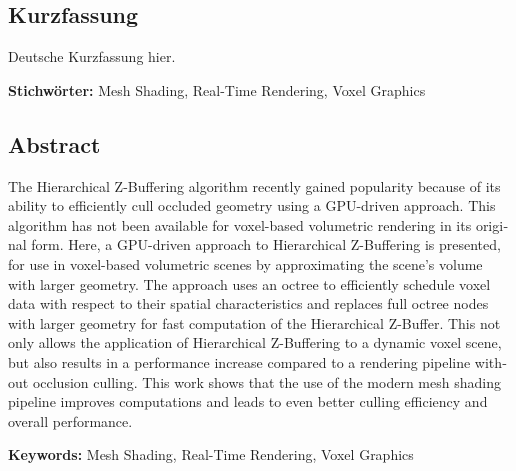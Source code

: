 \cleardoublepage

\begin{otherlanguage}{ngerman}
\chapter*{Kurzfassung}

Deutsche Kurzfassung hier.

\vfill
\noindent\textbf{Stichwörter:} Mesh Shading, Real-Time Rendering, Voxel Graphics
\vfill
\end{otherlanguage}
\begin{otherlanguage}{english}
\chapter*{Abstract}

The Hierarchical Z-Buffering algorithm recently gained popularity because of its ability to 
efficiently cull occluded geometry using a GPU-driven approach. This algorithm has not been 
available for voxel-based volumetric rendering in its original form. Here, a GPU-driven 
approach to Hierarchical Z-Buffering is presented, for use in voxel-based volumetric scenes 
by approximating the scene's volume with larger geometry. The approach uses an octree to 
efficiently schedule voxel data with respect to their spatial characteristics and replaces 
full octree nodes with larger geometry for fast computation of the Hierarchical Z-Buffer. 
This not only allows the application of Hierarchical Z-Buffering to a dynamic voxel scene, 
but also results in a performance increase compared to a rendering pipeline without occlusion 
culling. This work shows that the use of the modern mesh shading pipeline improves computations 
and leads to even better culling efficiency and overall performance.

\vfill
\noindent\textbf{Keywords:} Mesh Shading, Real-Time Rendering, Voxel Graphics
\vfill
\end{otherlanguage}
